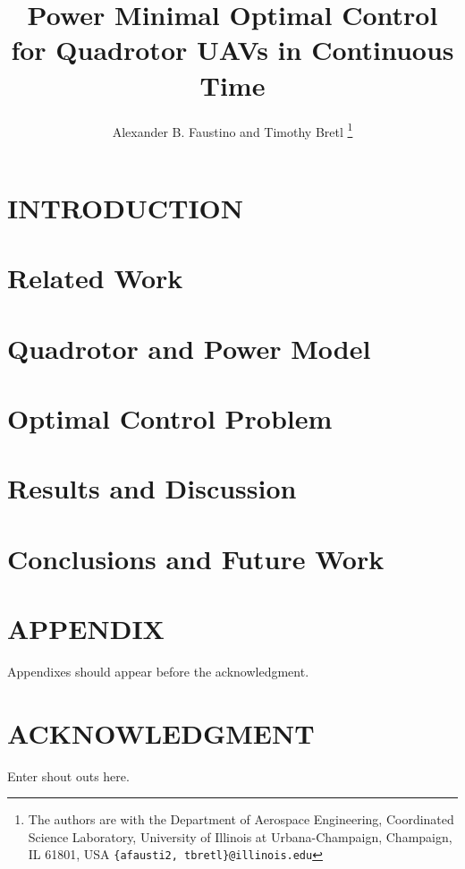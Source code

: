 \documentclass[letterpaper, 10 pt, conference]{ieeeconf}  %
\title{\LARGE \bf
Power Minimal Optimal Control for Quadrotor UAVs in Continuous Time
}
\author{Alexander B. Faustino and Timothy Bretl%
	\thanks{The authors are with the Department of Aerospace Engineering, Coordinated Science Laboratory, 
		University of Illinois at Urbana-Champaign, Champaign, IL 61801, USA
		\tt\small \{afausti2, tbretl\}@illinois.edu}%
}
\begin{document}
\maketitle
\thispagestyle{empty}
\pagestyle{empty}





\section{INTRODUCTION}
\label{intro}


\section{Related Work}
\label{related}


\section{Quadrotor and Power Model}
\label{model}


\section{Optimal Control Problem}
\label{formulation}


\section{Results and Discussion}
\label{results}


\section{Conclusions and Future Work}
\label{conclusion}




\section*{APPENDIX}

Appendixes should appear before the acknowledgment.

\section*{ACKNOWLEDGMENT}

Enter shout outs here.



\end{document}
